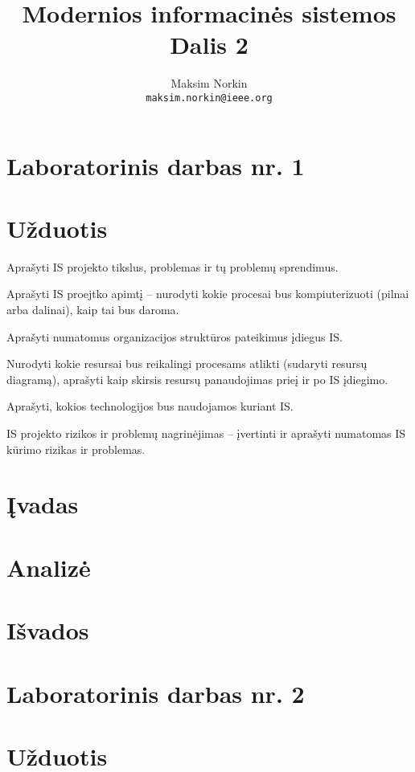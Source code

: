 \documentclass[10pt]{IEEEtran}
\author{Maksim Norkin\\ \texttt{maksim.norkin@ieee.org}}
\title{Modernios informacinės sistemos \\Dalis 2}
\begin{document}
    \maketitle

    \section{Laboratorinis darbas nr. 1}

        \section{Užduotis}

            Aprašyti IS projekto tikslus, problemas ir tų problemų sprendimus. 

            Aprašyti IS proejtko apimtį -- nurodyti kokie procesai bus kompiuterizuoti (pilnai arba dalinai), kaip tai bus daroma.

            Aprašyti numatomus organizacijos struktūros pateikimus įdiegus IS.

            Nurodyti kokie resursai bus reikalingi procesams atlikti (sudaryti resursų diagramą), aprašyti kaip skirsis resursų panaudojimas prieį ir po IS įdiegimo.

            Aprašyti, kokios technologijos bus naudojamos kuriant IS.

            IS projekto rizikos ir problemų nagrinėjimas -- įvertinti ir aprašyti numatomas IS kūrimo rizikas ir problemas.

        \section{Įvadas}

        \section{Analizė}

        \section{Išvados}

    \section{Laboratorinis darbas nr. 2}

        \section{Užduotis}
\end{document}
